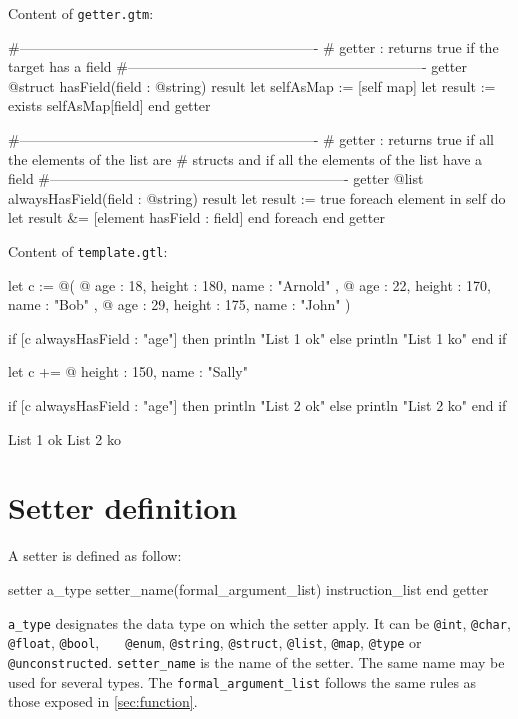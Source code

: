 \documentclass[10pt,openright,twosides]{report}
\newcommand{\gtlinline}[1]{\colorbox{light-blue}{\lstinline[language=gtl]{#1}}}
\begin{document}
\noindent Content of \texttt{\footnotesize getter.gtm}:
\begin{gtl}
#----------------------------------------------------------------
# getter : returns true if the target has a field
#----------------------------------------------------------------
getter @struct hasField(field : @string) result
  let selfAsMap := [self map]
  let result := exists selfAsMap[field]
end getter


#----------------------------------------------------------------
# getter : returns true if all the elements of the list are
# structs and if all the elements of the list have a field
#----------------------------------------------------------------
getter @list alwaysHasField(field : @string) result
  let result := true
  foreach element in self do
    let result &= [element hasField : field]
  end foreach
end getter
\end{gtl}
\noindent Content of \texttt{\footnotesize template.gtl}:
\begin{gtl}
let c := @(
  @{ age : 18, height : 180, name : "Arnold" },
  @{ age : 22, height : 170, name : "Bob"    },
  @{ age : 29, height : 175, name : "John"   }
)

if [c alwaysHasField : "age"] then
  println "List 1 ok"
else
  println "List 1 ko"
end if

let c += @{ height : 150, name : "Sally" }

if [c alwaysHasField : "age"] then
  println "List 2 ok"
else
  println "List 2 ko"
end if
\end{gtl}
\begin{console}
List 1 ok
List 2 ko
\end{console}

\section{Setter definition}

A setter is defined as follow:

\begin{gtl}
setter a_type setter_name(formal_argument_list)
  instruction_list
end getter
\end{gtl}

\gtlinline{a_type} designates the data type on which the setter apply. It can be \gtlinline{@int},  \gtlinline{@char}, \gtlinline{@float}, \gtlinline{@bool}, \gtlinline{	@enum}, \gtlinline{@string}, \gtlinline{@struct}, \gtlinline{@list}, \gtlinline{@map}, \gtlinline{@type} or \gtlinline{@unconstructed}. \gtlinline{setter_name} is the name of the setter. The same name may be used for several types. The \gtlinline{formal_argument_list} follows the same rules as those exposed in \ref{sec:function}.
\end{document}
